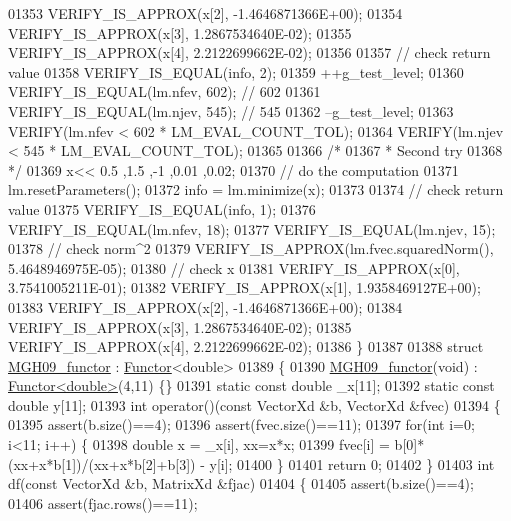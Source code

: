 \begin{DoxyCode}
01353   VERIFY\_IS\_APPROX(x[2], -1.4646871366E+00);
01354   VERIFY\_IS\_APPROX(x[3], 1.2867534640E-02);
01355   VERIFY\_IS\_APPROX(x[4], 2.2122699662E-02);
01356   
01357   \textcolor{comment}{// check return value}
01358   VERIFY\_IS\_EQUAL(info, 2); 
01359   ++g\_test\_level;
01360   VERIFY\_IS\_EQUAL(lm.nfev, 602);  \textcolor{comment}{// 602}
01361   VERIFY\_IS\_EQUAL(lm.njev, 545);  \textcolor{comment}{// 545}
01362   --g\_test\_level;
01363   VERIFY(lm.nfev < 602 * LM\_EVAL\_COUNT\_TOL);
01364   VERIFY(lm.njev < 545 * LM\_EVAL\_COUNT\_TOL);
01365 
01366   \textcolor{comment}{/*}
01367 \textcolor{comment}{   * Second try}
01368 \textcolor{comment}{   */}
01369   x<< 0.5  ,1.5  ,-1   ,0.01 ,0.02;
01370   \textcolor{comment}{// do the computation}
01371   lm.resetParameters();
01372   info = lm.minimize(x);
01373 
01374   \textcolor{comment}{// check return value}
01375   VERIFY\_IS\_EQUAL(info, 1);
01376   VERIFY\_IS\_EQUAL(lm.nfev, 18);
01377   VERIFY\_IS\_EQUAL(lm.njev, 15);
01378   \textcolor{comment}{// check norm^2}
01379   VERIFY\_IS\_APPROX(lm.fvec.squaredNorm(), 5.4648946975E-05);
01380   \textcolor{comment}{// check x}
01381   VERIFY\_IS\_APPROX(x[0], 3.7541005211E-01);
01382   VERIFY\_IS\_APPROX(x[1], 1.9358469127E+00);
01383   VERIFY\_IS\_APPROX(x[2], -1.4646871366E+00);
01384   VERIFY\_IS\_APPROX(x[3], 1.2867534640E-02);
01385   VERIFY\_IS\_APPROX(x[4], 2.2122699662E-02);
01386 \}
01387 
01388 \textcolor{keyword}{struct }\hyperlink{struct_m_g_h09__functor}{MGH09\_functor} : \hyperlink{struct_functor}{Functor}<double>
01389 \{
01390     \hyperlink{struct_m_g_h09__functor}{MGH09\_functor}(\textcolor{keywordtype}{void}) : \hyperlink{struct_functor}{Functor<double>}(4,11) \{\}
01391     \textcolor{keyword}{static} \textcolor{keyword}{const} \textcolor{keywordtype}{double} \_x[11];
01392     \textcolor{keyword}{static} \textcolor{keyword}{const} \textcolor{keywordtype}{double} y[11];
01393     \textcolor{keywordtype}{int} operator()(\textcolor{keyword}{const} VectorXd &b, VectorXd &fvec)
01394     \{
01395         assert(b.size()==4);
01396         assert(fvec.size()==11);
01397         \textcolor{keywordflow}{for}(\textcolor{keywordtype}{int} i=0; i<11; i++) \{
01398             \textcolor{keywordtype}{double} x = \_x[i], xx=x*x;
01399             fvec[i] = b[0]*(xx+x*b[1])/(xx+x*b[2]+b[3]) - y[i];
01400         \}
01401         \textcolor{keywordflow}{return} 0;
01402     \}
01403     \textcolor{keywordtype}{int} df(\textcolor{keyword}{const} VectorXd &b, MatrixXd &fjac)
01404     \{
01405         assert(b.size()==4);
01406         assert(fjac.rows()==11);

\end{DoxyCode}
